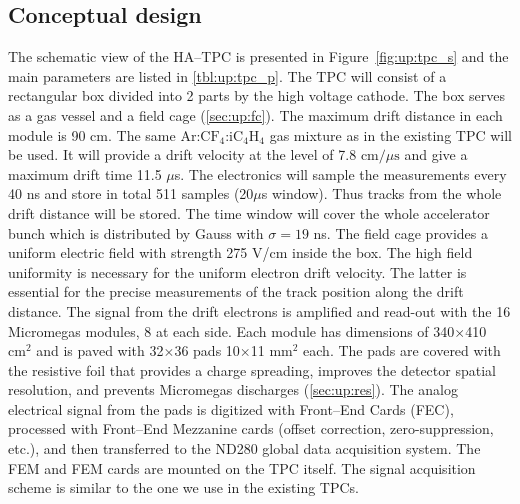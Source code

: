 \documentclass[../main.tex]{subfiles}
\begin{document}
\subsection{Conceptual design}
The schematic view of the HA--TPC is presented in Figure~\ref{fig:up:tpc_s} and the main parameters are listed in \autoref{tbl:up:tpc_p}. The TPC will consist of a rectangular box divided into 2 parts by the high voltage cathode. The box serves as a gas vessel and a field cage (\autoref{sec:up:fc}). The maximum drift distance in each module is 90 cm. The same $\text{Ar:CF}_4\text{:iC}_4\text{H}_4$ gas mixture as in the existing TPC will be used. It will provide a drift velocity at the level of 7.8 $\text{cm/}\mu\text{s}$ and give a maximum drift time 11.5 $\mu$s. The electronics will sample the measurements every 40 ns and store in total 511 samples (20$\mu$s window). Thus tracks from the whole drift distance will be stored. The time window will cover the whole accelerator bunch which is distributed by Gauss with $\sigma=19$ ns. The field cage provides a uniform electric field with strength 275 V/cm inside the box. The high field uniformity is necessary for the uniform electron drift velocity. The latter is essential for the precise measurements of the track position along the drift distance. The signal from the drift electrons is amplified and read-out with the 16 Micromegas modules, 8 at each side. Each module has dimensions of 340$\times$410 $\text{cm}^2$ and is paved with 32$\times$36 pads 10$\times$11 $\text{mm}^2$ each. The pads are covered with the resistive foil that provides a charge spreading, improves the detector spatial resolution, and prevents Micromegas discharges (\autoref{sec:up:res}). The analog electrical signal from the pads is digitized with Front--End Cards (FEC), processed with Front--End Mezzanine cards (offset correction, zero-suppression, etc.), and then transferred to the ND280 global data acquisition system. The FEM and FEM cards are mounted on the TPC itself. The signal acquisition scheme is similar to the one we use in the existing TPCs.
\end{document}
